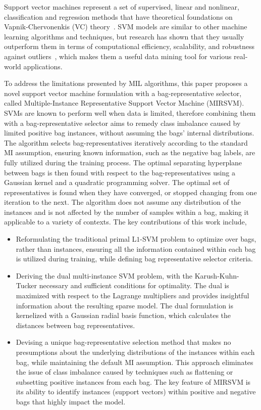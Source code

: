 \documentclass[preprint,12pt]{elsarticle}
\newcommand{\iitem}{\item[-]}
\begin{document}
Support vector machines represent a set of supervised, linear and nonlinear, classification and regression methods that have theoretical foundations on Vapnik-Chervonenkis (VC) theory~\citep{Huang2006,Schoelkopf2002}. SVM models are similar to other machine learning algorithms and techniques, but research has shown that they usually outperform them in terms of computational efficiency, scalability, and robustness against outliers~\citep{Kecman2016,Melki2016}, which makes them a useful data mining tool for various real-world applications. 

To address the limitations presented by MIL algorithms, this paper proposes a novel support vector machine formulation with a bag-representative selector, called Multiple-Instance Representative Support Vector Machine (MIRSVM). SVMs are known to perform well when data is limited, therefore combining them with a bag-representative selector aims to remedy class imbalance caused by limited positive bag instances, without assuming the bags' internal distributions. The algorithm selects bag-representatives iteratively according to the standard MI assumption, ensuring known information, such as the negative bag labels, are fully utilized during the training process. The optimal separating hyperplane between bags is then found with respect to the bag-representatives using a Gaussian kernel and a quadratic programming solver. The optimal set of representatives is found when they have converged, or stopped changing from one iteration to the next. The algorithm does not assume any distribution of the instances and is not affected by the number of samples within a bag, making it applicable to a variety of contexts. The key contributions of this work include,
\begin{itemize}
\iitem Reformulating the traditional primal L$1$-SVM problem to optimize over bags, rather than instances, ensuring all the information contained within each bag is utilized during training, while defining bag representative selector criteria.

\iitem Deriving the dual multi-instance SVM problem, with the Karush-Kuhn-Tucker necessary and sufficient conditions for optimality. The dual is maximized with respect to the Lagrange multipliers and provides insightful information about the resulting sparse model. The dual formulation is kernelized with a Gaussian radial basis function, which calculates the distances between bag representatives.

\iitem Devising a unique bag-representative selection method that makes no presumptions about the underlying distributions of the instances within each bag, while maintaining the default MI assumption. This approach eliminates the issue of class imbalance caused by techniques such as flattening or subsetting positive instances from each bag. The key feature of MIRSVM is its ability to identify instances (support vectors) within positive and negative bags that highly impact the model.
\end{itemize}
\end{document}
